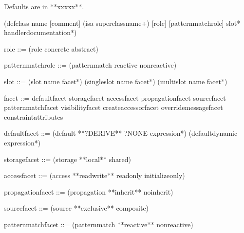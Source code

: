 \documentclass[letterpaper,10pt,english]{sphinxmanual}
\begin{document}
\begin{sphinxVerbatim}[commandchars=\\\{\}]
Defaults are in **xxxxx**.

(defclass \PYGZlt{}name\PYGZgt{} [\PYGZlt{}comment\PYGZgt{}]
  (is\PYGZhy{}a \PYGZlt{}superclass\PYGZhy{}name\PYGZgt{}+)
  [\PYGZlt{}role\PYGZgt{}]
  [\PYGZlt{}pattern\PYGZhy{}match\PYGZhy{}role\PYGZgt{}]
  \PYGZlt{}slot\PYGZgt{}*
  \PYGZlt{}handler\PYGZhy{}documentation\PYGZgt{}*)

\PYGZlt{}role\PYGZgt{} ::= (role concrete \textbar{} abstract)

\PYGZlt{}pattern\PYGZhy{}match\PYGZhy{}role\PYGZgt{} ::= (pattern\PYGZhy{}match reactive \textbar{} non\PYGZhy{}reactive)

\PYGZlt{}slot\PYGZgt{} ::= (slot \PYGZlt{}name\PYGZgt{} \PYGZlt{}facet\PYGZgt{}*) \textbar{} (single\PYGZhy{}slot \PYGZlt{}name\PYGZgt{} \PYGZlt{}facet\PYGZgt{}*) \textbar{}
           (multislot \PYGZlt{}name\PYGZgt{} \PYGZlt{}facet\PYGZgt{}*)

\PYGZlt{}facet\PYGZgt{} ::= \PYGZlt{}default\PYGZhy{}facet\PYGZgt{} \textbar{} \PYGZlt{}storage\PYGZhy{}facet\PYGZgt{} \textbar{}
            \PYGZlt{}access\PYGZhy{}facet\PYGZgt{} \textbar{} \PYGZlt{}propagation\PYGZhy{}facet\PYGZgt{} \textbar{}
            \PYGZlt{}source\PYGZhy{}facet\PYGZgt{} \textbar{} \PYGZlt{}pattern\PYGZhy{}match\PYGZhy{}facet\PYGZgt{} \textbar{}
            \PYGZlt{}visibility\PYGZhy{}facet\PYGZgt{} \textbar{} \PYGZlt{}create\PYGZhy{}accessor\PYGZhy{}facet\PYGZgt{}
            \PYGZlt{}override\PYGZhy{}message\PYGZhy{}facet\PYGZgt{} \textbar{} \PYGZlt{}constraint\PYGZhy{}attributes\PYGZgt{}

\PYGZlt{}default\PYGZhy{}facet\PYGZgt{} ::= (default **?DERIVE** \textbar{} ?NONE \textbar{} \PYGZlt{}expression\PYGZgt{}*) \textbar{}
                    (default\PYGZhy{}dynamic \PYGZlt{}expression\PYGZgt{}*)

\PYGZlt{}storage\PYGZhy{}facet\PYGZgt{} ::= (storage **local** \textbar{} shared)

\PYGZlt{}access\PYGZhy{}facet\PYGZgt{} ::= (access **read\PYGZhy{}write** \textbar{} read\PYGZhy{}only \textbar{} initialize\PYGZhy{}only)

\PYGZlt{}propagation\PYGZhy{}facet\PYGZgt{} ::= (propagation **inherit** \textbar{} no\PYGZhy{}inherit)

\PYGZlt{}source\PYGZhy{}facet\PYGZgt{} ::= (source **exclusive** \textbar{} composite)

\PYGZlt{}pattern\PYGZhy{}match\PYGZhy{}facet\PYGZgt{} ::= (pattern\PYGZhy{}match **reactive** \textbar{} non\PYGZhy{}reactive)


\end{sphinxVerbatim}
\end{document}
